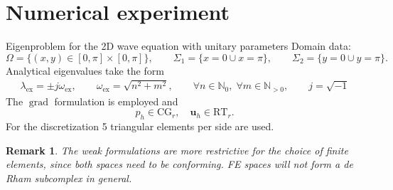 \documentclass[aspectratio=169]{beamer}
\DeclareMathOperator*{\grad}{grad}
\newtheorem{remark}{Remark}
\begin{document}
\section{Numerical experiment}

\begin{frame}{Eigenproblem for the 2D wave equation with unitary parameters}
	Domain data:
	\begin{equation*}
		\Omega = \{(x,y) \in [0, \pi] \times [0, \pi]\},\qquad 
		\Sigma_1= \{x=0 \cup x=\pi\}, \qquad \Sigma_2 = \{y=0 \cup y=\pi\}.
	\end{equation*}
	Analytical eigenvalues take the form
	\begin{equation*}
		\begin{aligned}
			\lambda_{\mathrm{ex}}=\pm j \omega_{\mathrm{ex}}, \qquad 	\omega_{\mathrm{ex}} = \sqrt{n^2 + m^2},\qquad  \forall n \in \mathbb{N}_{0}, \; \forall m \in \mathbb{N}_{>0}, \qquad j=\sqrt{-1}
		\end{aligned}
	\end{equation*}
The $\grad$ formulation is employed and 
\begin{equation*}
		p_h \in \mathrm{CG}_r, \quad \bm{u}_h \in \mathrm{RT}_r.
\end{equation*}
 For the discretization 5 triangular elements per side are used.

 
\begin{remark}
	The weak formulations are more restrictive for the choice of  finite elements,  since both spaces need to be conforming. FE spaces will not form a de Rham subcomplex in general.
\end{remark}

\end{frame}
\end{document}
